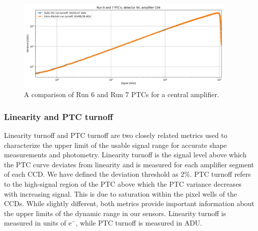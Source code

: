 \begin{figure}[ht]
\begin{centering}
\includegraphics[width=0.95\textwidth]{figures/baselineCharacterization/run7PTCsToDate.jpg}
\caption{A comparison of Run 6 and Run 7 PTCs for a central amplifier.}
\end{centering}
\end{figure}

\subsubsection{Linearity and PTC turnoff}\label{linearity-and-ptc-turnoff}

Linearity turnoff and PTC turnoff are two closely related metrics used
to characterize the upper limit of the usable signal range for accurate shape measurements and photometry. Linearity turnoff is the signal level above which the PTC curve deviates from
linearity and is measured for each amplifier segment of each CCD. We have defined the deviation threshold as 2\%.
PTC turnoff refers to the high-signal region of the PTC above which the PTC
variance decreases with increasing signal. This is due to saturation within the pixel wells of the CCDs. While slightly different, both metrics
provide important information about the upper limits of the dynamic
range in our sensors. Linearity turnoff is measured in units of e$^-$,
while PTC turnoff is measured in ADU.

